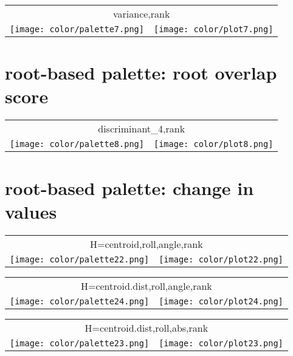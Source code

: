 \documentclass{article}
\begin{document}
\begin{center}
\begin{tabular}{m{8cm}m{8cm}}
\multicolumn{2}{c}{variance,rank} \\
\texttt{[image: color/palette7.png]} &
\texttt{[image: color/plot7.png]}
\end{tabular}
\end{center}

\newpage
\section{root-based palette: root overlap score}

\begin{center}
\begin{tabular}{m{8cm}m{8cm}}
\multicolumn{2}{c}{discriminant\_4,rank} \\
\texttt{[image: color/palette8.png]} &
\texttt{[image: color/plot8.png]}
\end{tabular}
\end{center}

\newpage
\section{root-based palette: change in values}

\begin{center}
\begin{tabular}{m{8cm}m{8cm}}
\multicolumn{2}{c}{H=centroid,roll,angle,rank} \\
\texttt{[image: color/palette22.png]} &
\texttt{[image: color/plot22.png]}
\end{tabular}
\end{center}

\begin{center}
\begin{tabular}{m{8cm}m{8cm}}
\multicolumn{2}{c}{H=centroid.dist,roll,angle,rank} \\
\texttt{[image: color/palette24.png]} &
\texttt{[image: color/plot24.png]}
\end{tabular}
\end{center}


\begin{center}
\begin{tabular}{m{8cm}m{8cm}}
\multicolumn{2}{c}{H=centroid.dist,roll,abs,rank} \\
\texttt{[image: color/palette23.png]} &
\texttt{[image: color/plot23.png]}
\end{tabular}
\end{center}
\end{document}
